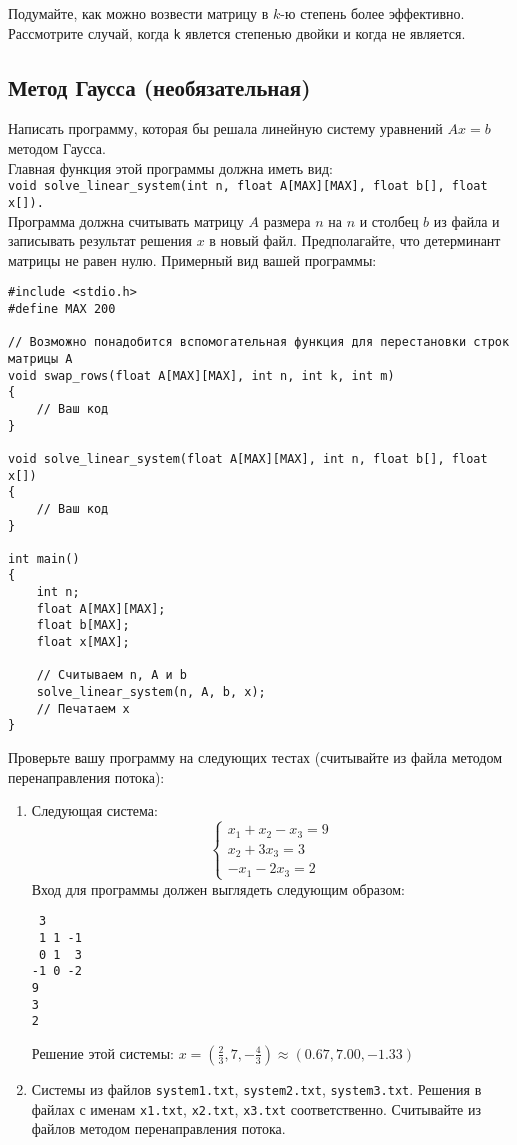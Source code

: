 \documentclass{article}
\begin{document}
Подумайте, как можно возвести матрицу в $k$-ю степень более эффективно. Рассмотрите случай, когда \texttt{k} явлется степенью двойки и когда не является.


\newpage
\subsection{Метод Гаусса (необязательная)}
Написать программу, которая бы решала линейную систему уравнений $Ax = b$ методом Гаусса. \\
Главная функция этой программы должна иметь вид: \\ \texttt{void solve\_linear\_system(int n, float A[MAX][MAX], float b[], float x[]).} \\
Программа должна считывать матрицу $A$ размера $n$ на $n$ и столбец $b$ из файла и записывать результат решения $x$ в новый файл. Предполагайте, что детерминант матрицы не равен нулю. Примерный вид вашей программы:
\begin{lstlisting}
#include <stdio.h>
#define MAX 200

// Возможно понадобится вспомогательная функция для перестановки строк матрицы A
void swap_rows(float A[MAX][MAX], int n, int k, int m)
{
    // Ваш код
}

void solve_linear_system(float A[MAX][MAX], int n, float b[], float x[])
{
    // Ваш код
}

int main()
{
    int n;
    float A[MAX][MAX];
    float b[MAX];
    float x[MAX];
    
    // Считываем n, A и b
    solve_linear_system(n, A, b, x);
    // Печатаем x
}
\end{lstlisting}
Проверьте вашу программу на следующих тестах (считывайте из файла методом перенаправления потока): \\
\begin{enumerate}
\item Следующая система:
$$
\begin{cases} 
x_1 + x_2 - x_3 = 9 \\ 
x_2 + 3x_3 = 3 \\ 
-x_1 - 2x_3 = 2 
\end{cases}
$$
Вход для программы должен выглядеть следующим образом:
\begin{lstlisting}
 3
 1 1 -1
 0 1  3
-1 0 -2
9
3
2
\end{lstlisting}
Решение этой системы: $x = \left(\frac{2}{3}, 7, -\frac{4}{3}\right) \approx (0.67, 7.00, -1.33)$
\item Системы из файлов \texttt{system1.txt}, \texttt{system2.txt}, \texttt{system3.txt}. Решения в файлах с именам \texttt{x1.txt}, \texttt{x2.txt}, \texttt{x3.txt} соответственно. Считывайте из файлов методом перенаправления потока.
\end{enumerate}
\end{document}
